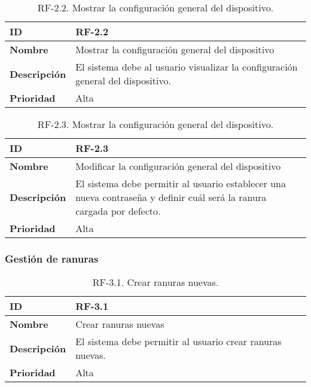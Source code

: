 \begin{table}[h!]
    \centering
    \begin{tabular}{|m{2.5cm}|m{9.27cm}|}
        \hline
        \textbf{ID} & RF-2.2 \\
        \hline
        \textbf{Nombre} & Mostrar la configuración general del dispositivo \\
        \hline
        \textbf{Descripción} & El sistema debe al usuario visualizar la configuración general del dispositivo. \\
        \hline
        \textbf{Prioridad} & Alta \\
        \hline
    \end{tabular}
    \caption{RF-2.2. Mostrar la configuración general del dispositivo.}
\end{table}

\begin{table}[h!]
    \centering
    \begin{tabular}{|m{2.5cm}|m{9.27cm}|}
        \hline
        \textbf{ID} & RF-2.3 \\
        \hline
        \textbf{Nombre} & Modificar la configuración general del dispositivo \\
        \hline
        \textbf{Descripción} & El sistema debe permitir al usuario establecer una nueva contraseña y definir cuál será la ranura cargada por defecto. \\
        \hline
        \textbf{Prioridad} & Alta \\
        \hline
    \end{tabular}
    \caption{RF-2.3. Mostrar la configuración general del dispositivo.}
\end{table}

\subsubsection{Gestión de ranuras}

\begin{table}[h!]
    \centering
    \begin{tabular}{|m{2.5cm}|m{9.27cm}|}
        \hline
        \textbf{ID} & RF-3.1 \\
        \hline
        \textbf{Nombre} & Crear ranuras nuevas \\
        \hline
        \textbf{Descripción} & El sistema debe permitir al usuario crear ranuras nuevas. \\
        \hline
        \textbf{Prioridad} & Alta \\
        \hline
    \end{tabular}
    \caption{RF-3.1. Crear ranuras nuevas.}
\end{table}

